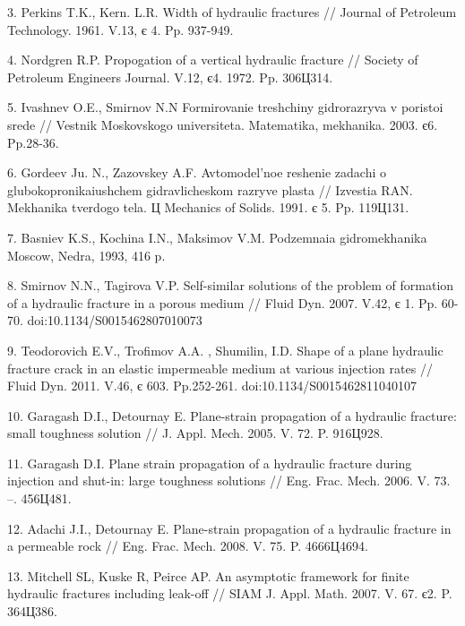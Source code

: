 3.	Perkins T.K., Kern. L.R. Width of hydraulic fractures // Journal of Petroleum Technology. 1961. V.13, є 4. Pp. 937-949.



4.	Nordgren R.P. Propogation of a vertical hydraulic fracture // Society of Petroleum Engineers Journal. V.12, є4. 1972. Pp. 306Ц314.



5.	Ivashnev O.E., Smirnov N.N Formirovanie treshchiny gidrorazryva v poristoi srede // Vestnik Moskovskogo universiteta. Matematika, mekhanika. 2003. є6. Pp.28-36.



6.	Gordeev Ju. N., Zazovskey A.F. Avtomodel'noe reshenie zadachi o glubokopronikaiushchem gidravlicheskom razryve plasta // Izvestia RAN. Mekhanika tverdogo tela. Ц Mechanics of Solids. 1991. є 5. Pp. 119Ц131.



7.	Basniev K.S., Kochina I.N., Maksimov V.M. Podzemnaia gidromekhanika Moscow, Nedra, 1993, 416 p.



8.	Smirnov N.N., Tagirova V.P. Self-similar solutions of the problem of formation of a hydraulic fracture in a porous medium // Fluid Dyn. 2007. V.42, є 1. Pp. 60-70. doi:10.1134/S0015462807010073



9.	Teodorovich E.V., Trofimov A.A. , Shumilin, I.D.  Shape of a plane hydraulic fracture crack in an elastic impermeable medium at various injection rates // Fluid Dyn. 2011. V.46, є 603. Pp.252-261. doi:10.1134/S0015462811040107



10.	Garagash D.I., Detournay E. Plane-strain propagation of a hydraulic fracture: small toughness solution // J. Appl. Mech. 2005. V. 72. P. 916Ц928.



11.	Garagash D.I. Plane strain propagation of a hydraulic fracture during injection and shut-in: large toughness solutions // Eng. Frac. Mech. 2006. V. 73. –. 456Ц481.



12.	Adachi J.I., Detournay E. Plane-strain propagation of a hydraulic fracture in a permeable rock // Eng. Frac. Mech. 2008. V. 75. P. 4666Ц4694.



13.	Mitchell SL, Kuske R, Peirce AP. An asymptotic framework for finite hydraulic fractures including leak-off // SIAM J. Appl. Math. 2007. V. 67. є2. P. 364Ц386.



